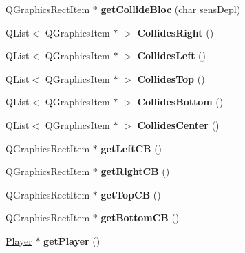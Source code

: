 \begin{DoxyCompactItemize}
\item 
\hypertarget{class_pingouin_ac9648ffb7a4da9385b6a424a419b1844}{}Q\+Graphics\+Rect\+Item $\ast$ {\bfseries get\+Collide\+Bloc} (char sens\+Depl)\label{class_pingouin_ac9648ffb7a4da9385b6a424a419b1844}

\item 
\hypertarget{class_pingouin_ae52b664bec9976b1026e92022e0409db}{}Q\+List$<$ Q\+Graphics\+Item $\ast$ $>$ {\bfseries Collides\+Right} ()\label{class_pingouin_ae52b664bec9976b1026e92022e0409db}

\item 
\hypertarget{class_pingouin_a0f46058cc86907aa0f7890a89f87b143}{}Q\+List$<$ Q\+Graphics\+Item $\ast$ $>$ {\bfseries Collides\+Left} ()\label{class_pingouin_a0f46058cc86907aa0f7890a89f87b143}

\item 
\hypertarget{class_pingouin_aa86037613d06b3f9f3c25d0979702bd5}{}Q\+List$<$ Q\+Graphics\+Item $\ast$ $>$ {\bfseries Collides\+Top} ()\label{class_pingouin_aa86037613d06b3f9f3c25d0979702bd5}

\item 
\hypertarget{class_pingouin_a93e102222ed4acde6df83c651b8d3b61}{}Q\+List$<$ Q\+Graphics\+Item $\ast$ $>$ {\bfseries Collides\+Bottom} ()\label{class_pingouin_a93e102222ed4acde6df83c651b8d3b61}

\item 
\hypertarget{class_pingouin_aafaf2cc224d3476459efe9c55d2b8912}{}Q\+List$<$ Q\+Graphics\+Item $\ast$ $>$ {\bfseries Collides\+Center} ()\label{class_pingouin_aafaf2cc224d3476459efe9c55d2b8912}

\item 
\hypertarget{class_pingouin_a44549cdbb9dffeaf95b13aff69b63de1}{}Q\+Graphics\+Rect\+Item $\ast$ {\bfseries get\+Left\+C\+B} ()\label{class_pingouin_a44549cdbb9dffeaf95b13aff69b63de1}

\item 
\hypertarget{class_pingouin_a1481b2b9ba69162172fe6368ff38ebad}{}Q\+Graphics\+Rect\+Item $\ast$ {\bfseries get\+Right\+C\+B} ()\label{class_pingouin_a1481b2b9ba69162172fe6368ff38ebad}

\item 
\hypertarget{class_pingouin_a5f24049dbfc187822e2d7a430b691dff}{}Q\+Graphics\+Rect\+Item $\ast$ {\bfseries get\+Top\+C\+B} ()\label{class_pingouin_a5f24049dbfc187822e2d7a430b691dff}

\item 
\hypertarget{class_pingouin_a62c65f5df2708bbfa22f7d794bfcffc3}{}Q\+Graphics\+Rect\+Item $\ast$ {\bfseries get\+Bottom\+C\+B} ()\label{class_pingouin_a62c65f5df2708bbfa22f7d794bfcffc3}

\item 
\hypertarget{class_pingouin_a0b57fcabaf2518e98b4511c8bba35a40}{}\hyperlink{class_player}{Player} $\ast$ {\bfseries get\+Player} ()\label{class_pingouin_a0b57fcabaf2518e98b4511c8bba35a40}

\end{DoxyCompactItemize}
